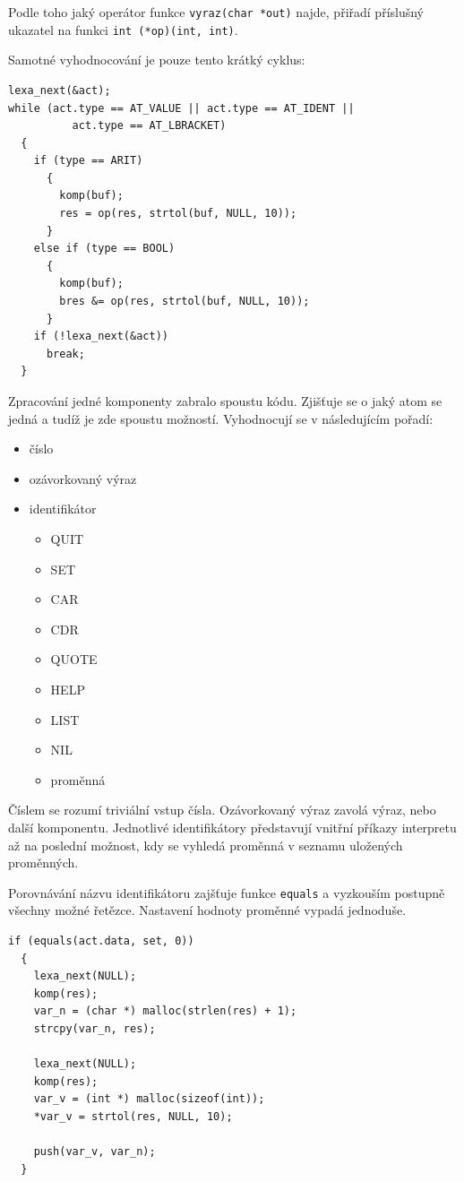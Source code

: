 \documentclass[a4paper, 12pt]{article}
\begin{document}
Podle toho jaký operátor funkce \texttt{vyraz(char *out)}
najde, přiřadí příslušný ukazatel na funkci \verb+int (*op)(int, int)+.

Samotné vyhodnocování je pouze tento krátký cyklus:
\begin{lstlisting}
lexa_next(&act);
while (act.type == AT_VALUE || act.type == AT_IDENT ||
          act.type == AT_LBRACKET)
  {
    if (type == ARIT)
      {
        komp(buf);
        res = op(res, strtol(buf, NULL, 10));
      }
    else if (type == BOOL)
      {
        komp(buf);
        bres &= op(res, strtol(buf, NULL, 10));
      }
    if (!lexa_next(&act))
      break;
  }
\end{lstlisting}

Zpracování jedné komponenty zabralo spoustu kódu.
Zjišťuje se o jaký atom se jedná a tudíž je zde spoustu
možností. Vyhodnocují se v následujícím pořadí:
\begin{itemize}
\item číslo
\item ozávorkovaný výraz
\item identifikátor
\begin{itemize}
\item QUIT
\item SET
\item CAR
\item CDR
\item QUOTE
\item HELP
\item LIST
\item NIL
\item proměnná
\end{itemize}

\end{itemize}

Číslem se rozumí triviální vstup čísla. Ozávorkovaný výraz zavolá
výraz, nebo další komponentu. Jednotlivé identifikátory představují
vnitřní příkazy interpretu až na poslední možnost, kdy se vyhledá
proměnná v seznamu uložených proměnných.

Porovnávání názvu identifikátoru zajšťuje funkce \texttt{equals}
a vyzkouším postupně všechny možné řetězce. Nastavení hodnoty
proměnné vypadá jednoduše.

\begin{lstlisting}
if (equals(act.data, set, 0))
  {
    lexa_next(NULL);
    komp(res);
    var_n = (char *) malloc(strlen(res) + 1);
    strcpy(var_n, res);

    lexa_next(NULL);
    komp(res);
    var_v = (int *) malloc(sizeof(int));
    *var_v = strtol(res, NULL, 10);
	  
    push(var_v, var_n);
  }
\end{lstlisting}
\end{document}
